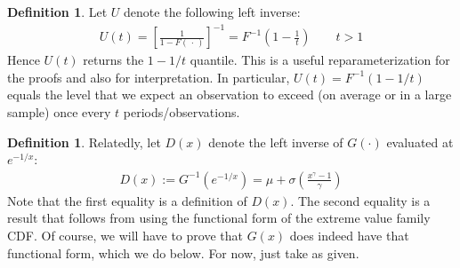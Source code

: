 \documentclass[12pt]{article}
\theoremstyle{plain}
\theoremstyle{definition}
\newtheorem{defn}[thm]{Definition}
\theoremstyle{remark}
\begin{document}
\begin{defn}
Let $U$ denote the following left inverse:
\begin{align*}
  U(t)
  =
  \left[
  \frac{1}{1-F(\,\cdot\,)}
  \right]^{-1}
  =
  F^{-1}\left(1-\frac{1}{t}\right)
  \qquad t>1
\end{align*}
Hence $U(t)$ returns the $1-1/t$ quantile.
This is a useful reparameterization for the proofs and also for
interpretation.
In particular, $U(t)=F^{-1}(1-1/t)$ equals the level that we expect an
observation to exceed (on average or in a large sample) once every $t$
periods/observations.
\end{defn}

\begin{defn}
Relatedly, let $D(x)$ denote the left inverse of $G(\cdot)$ evaluated at
$e^{-1/x}$:
\begin{align*}
  D(x):= G^{-1}\left(e^{-1/x}\right)
  =
  \mu+\sigma
  \left(
  \frac{x^{\gamma}-1}{\gamma}
  \right)
\end{align*}
Note that the first equality is a definition of $D(x)$.
The second equality is a result that follows from using the functional
form of the extreme value family CDF. Of course, we will have to prove
that $G(x)$ does indeed have that functional form, which we do below.
For now, just take as given.
\end{defn}
\end{document}
